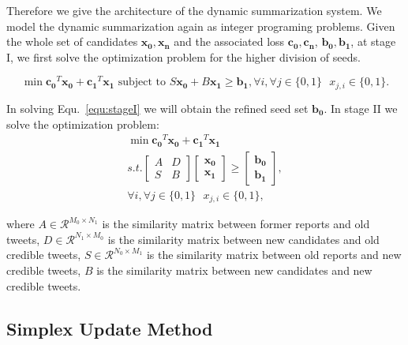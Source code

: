 \documentclass{llncs}
\begin{document}
Therefore we give the architecture of the dynamic summarization system. We model the dynamic summarization again as integer programing problems.  Given the whole set of candidates $\mathbf{x_0,x_n}$ and the associated loss $\mathbf{c_0,c_n}$, $\mathbf{b_0,b_1}$, at stage I, we first solve the optimization problem for the higher division of seeds. 

\begin{equation}\label{equ:stageI}
\min \mathbf{c_0}^T \mathbf{x_0} + \mathbf{c_1}^T \mathbf{x_1} \textrm{ subject to } S \mathbf{x_0} + B\mathbf{x_1} \geq \mathbf{b_1}, \forall i, \forall j\in \{0,1\}\textrm{ } x_{j,i}\in \{0,1\}.
\end{equation}

In solving Equ.~\ref{equ:stageI} we will obtain the refined seed set $\mathbf{b_0}$. In stage II we solve the optimization problem:
\begin{eqnarray}
\min \mathbf{c_0}^T \mathbf{x_0}+\mathbf{c_1}^T\mathbf{x_1}\\\nonumber
s.t. \begin{bmatrix}
A & D \\
S & B
\end{bmatrix}\begin{bmatrix}
 \mathbf{x_0}\\
\mathbf{x_1}
\end{bmatrix}\geq \begin{bmatrix}
\mathbf{b_0}\\
\mathbf{b_1}
\end{bmatrix},\\\nonumber
 \forall i, \forall j\in \{0,1\}\textrm{ } x_{j,i}\in \{0,1\}, 
\end{eqnarray}

where $A\in \mathcal{R}^{M_0\times N_1}$ is the similarity matrix between former reports and old tweets, $D\in \mathcal{R}^{N_1\times M_0}$ is the similarity matrix between new candidates and old credible tweets, $S\in \mathcal{R}^{N_0\times M_1}$ is the similarity matrix between old reports and new credible tweets, $B$ is the similarity matrix between new candidates and new credible tweets.

\subsection{Simplex Update Method}


\end{document}
